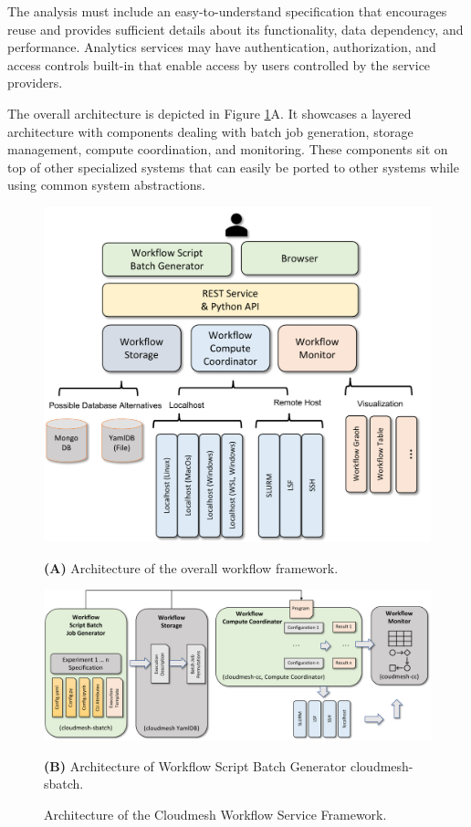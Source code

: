 \documentclass[utf8]{FrontiersinVancouver} %
\begin{document}
The analysis must include an easy-to-understand specification
that encourages reuse and provides sufficient details about its
functionality, data dependency, and performance. Analytics services
may have authentication, authorization, and access controls built-in
that enable access by users controlled by the service providers.

The overall architecture is depicted in Figure \ref{fig:cc-2}A. It
showcases a layered architecture with components dealing with batch
job generation, storage management, compute coordination, and
monitoring. These components sit on top of other specialized systems
that can easily be ported to other systems while using common system
abstractions.

\begin{figure}[htb]
    \centering\includegraphics[width=0.70\columnwidth]{images/cloudmesh-cc-new}
    
    {\bf (A)} Architecture of the overall workflow framework.

\bigskip\bigskip
    
    \centering\includegraphics[width=1.0\columnwidth]{images/cloudmesh-sbatch-new}
    
    
    {\bf (B)} Architecture of Workflow Script Batch Generator cloudmesh-sbatch.

    \caption{Architecture of the Cloudmesh Workflow Service Framework.}
    \label{fig:cc-2}

\end{figure}
\end{document}
